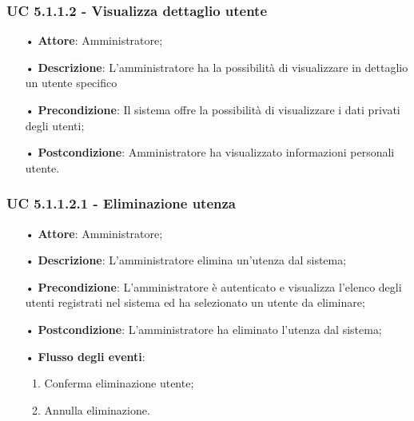 \subsubsection{UC 5.1.1.2 - Visualizza dettaglio utente}
\begin{itemize}
	
	\item[•] \textbf{Attore}: Amministratore;
	\item[•] \textbf{Descrizione}: L'amministratore ha la possibilità di visualizzare in dettaglio un utente specifico
	\item[•] \textbf{Precondizione}: Il sistema offre la possibilità di visualizzare i dati privati degli utenti;
	\item[•] \textbf{Postcondizione}: Amministratore ha visualizzato informazioni personali utente.
	
\end{itemize}


\subsubsection{UC 5.1.1.2.1 - Eliminazione utenza}
\begin{itemize}
\item[•] \textbf{Attore}: Amministratore;
\item[•] \textbf{Descrizione}: L'amministratore elimina un'utenza dal sistema;
\item[•] \textbf{Precondizione}: L'amministratore \`{e} autenticato e visualizza l'elenco degli utenti registrati nel sistema ed ha selezionato un utente da eliminare;
\item[•] \textbf{Postcondizione}: L'amministratore ha eliminato l'utenza dal sistema; 
\item[•] \textbf{Flusso degli eventi}:

\begin{enumerate}
\item Conferma eliminazione utente;
\item Annulla eliminazione.
\end{enumerate}
\end{itemize}


